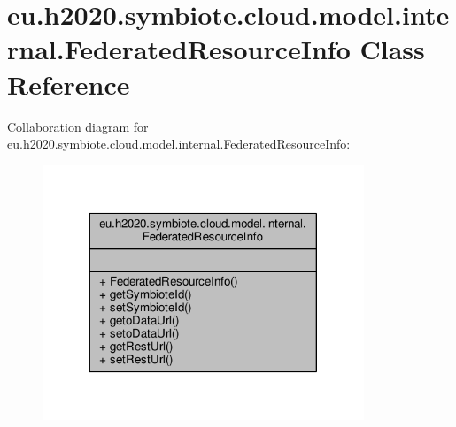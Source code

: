 \hypertarget{classeu_1_1h2020_1_1symbiote_1_1cloud_1_1model_1_1internal_1_1FederatedResourceInfo}{}\section{eu.\+h2020.\+symbiote.\+cloud.\+model.\+internal.\+Federated\+Resource\+Info Class Reference}
\label{classeu_1_1h2020_1_1symbiote_1_1cloud_1_1model_1_1internal_1_1FederatedResourceInfo}


Collaboration diagram for eu.\+h2020.\+symbiote.\+cloud.\+model.\+internal.\+Federated\+Resource\+Info\+:\nopagebreak
\begin{figure}[H]
\begin{center}
\leavevmode
\includegraphics[width=272pt]{classeu_1_1h2020_1_1symbiote_1_1cloud_1_1model_1_1internal_1_1FederatedResourceInfo__coll__graph}
\end{center}
\end{figure}
